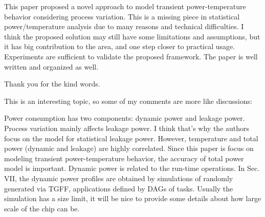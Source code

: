 \begin{reviewer}
This paper proposed a novel approach to model transient power-temperature behavior considering process variation. This is a missing piece in statistical power/temperature analysis due to many reasons and technical difficulties. I think the proposed solution may still have some limitations and assumptions, but it has big contribution to the area, and one step closer to practical usage. Experiments are sufficient to validate the proposed framework. The paper is well written and organized as well.
\end{reviewer}
\begin{authors}
Thank you for the kind words.
\end{authors}

\begin{reviewer}
This is an interesting topic, so some of my comments are more like discussions:

Power consumption has two components: dynamic power and leakage power. Process variation mainly affects leakage power. I think that’s why the authors focus on the model for statistical leakage power. However, temperature and total power (dynamic and leakage) are highly correlated. Since this paper is focus on modeling transient power-temperature behavior, the accuracy of total power model is important. Dynamic power is related to the run-time operations. In Sec. VII, the dynamic power profiles are obtained by simulations of randomly generated via TGFF, applications defined by DAGs of tasks. Usually the simulation has a size limit, it will be nice to provide some details about how large scale of the chip can be.
\end{reviewer}
